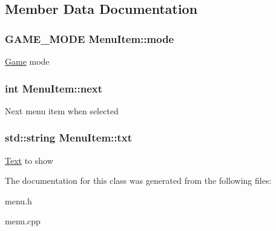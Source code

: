 \subsection{Member Data Documentation}
\hypertarget{class_menu_item_a36a3108f1bcce16b57d41bea1cff0137}{
\subsubsection[{mode}]{\setlength{\rightskip}{0pt plus 5cm}G\-A\-M\-E\-\_\-\-M\-O\-D\-E Menu\-Item\-::mode}}\label{class_menu_item_a36a3108f1bcce16b57d41bea1cff0137}
\hyperlink{class_game}{Game} mode \hypertarget{class_menu_item_afed5cf8923dfc7a3fe6f05f1c5bbb1db}{
\subsubsection[{next}]{\setlength{\rightskip}{0pt plus 5cm}int Menu\-Item\-::next}}\label{class_menu_item_afed5cf8923dfc7a3fe6f05f1c5bbb1db}
Next menu item when selected \hypertarget{class_menu_item_ab7c37bd62ab20b28def5f0f8596a0504}{
\subsubsection[{txt}]{\setlength{\rightskip}{0pt plus 5cm}std\-::string Menu\-Item\-::txt}}\label{class_menu_item_ab7c37bd62ab20b28def5f0f8596a0504}
\hyperlink{class_text}{Text} to show 

The documentation for this class was generated from the following files\-:\begin{DoxyCompactItemize}
\item 
menu.\-h\item 
menu.\-cpp\end{DoxyCompactItemize}
